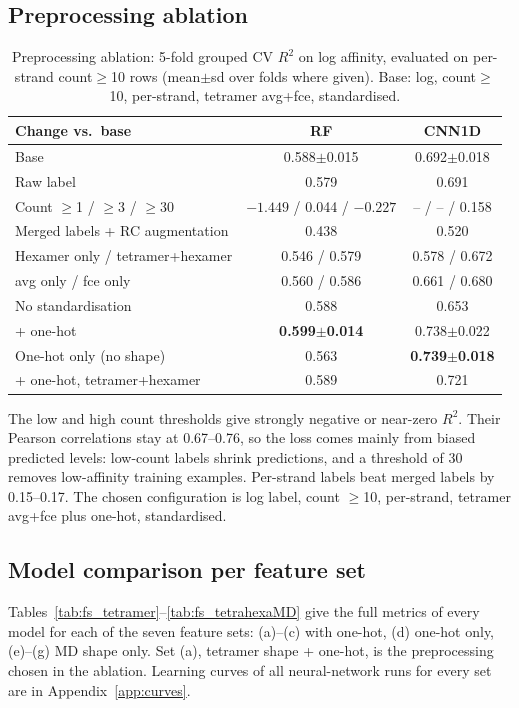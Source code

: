 \documentclass[11pt,a4paper]{article}
\begin{document}
\subsection{Preprocessing ablation}
\begin{table}[H]\centering\small
\caption{Preprocessing ablation: 5-fold grouped CV $R^2$ on log affinity, evaluated on per-strand count$\geq$10 rows (mean$\pm$sd over folds where given). Base: log, count$\geq$10, per-strand, tetramer avg+fce, standardised.}
\begin{tabular}{lcc}\toprule
Change vs.\ base & RF & CNN1D \\\midrule
Base & 0.588$\pm$0.015 & 0.692$\pm$0.018\\
Raw label & 0.579 & 0.691\\
Count $\geq$1 / $\geq$3 / $\geq$30 & $-1.449$ / 0.044 / $-0.227$ & -- / -- / 0.158\\
Merged labels + RC augmentation & 0.438 & 0.520\\
Hexamer only / tetramer+hexamer & 0.546 / 0.579 & 0.578 / 0.672\\
avg only / fce only & 0.560 / 0.586 & 0.661 / 0.680\\
No standardisation & 0.588 & 0.653\\
+ one-hot & \textbf{0.599$\pm$0.014} & 0.738$\pm$0.022\\
One-hot only (no shape) & 0.563 & \textbf{0.739$\pm$0.018}\\
+ one-hot, tetramer+hexamer & 0.589 & 0.721\\\bottomrule
\end{tabular}\label{tab:abl}\end{table}
The low and high count thresholds give strongly negative or near-zero $R^2$. Their Pearson correlations stay at 0.67--0.76, so the loss comes mainly from biased predicted levels: low-count labels shrink predictions, and a threshold of 30 removes low-affinity training examples. Per-strand labels beat merged labels by 0.15--0.17. The chosen configuration is log label, count $\geq$10, per-strand, tetramer avg+fce plus one-hot, standardised.

\subsection{Model comparison per feature set}
Tables~\ref{tab:fs_tetramer}--\ref{tab:fs_tetrahexaMD} give the full metrics of every model for each of the seven feature sets: (a)--(c) with one-hot, (d) one-hot only, (e)--(g) MD shape only. Set (a), tetramer shape + one-hot, is the preprocessing chosen in the ablation. Learning curves of all neural-network runs for every set are in Appendix~\ref{app:curves}.
\end{document}
